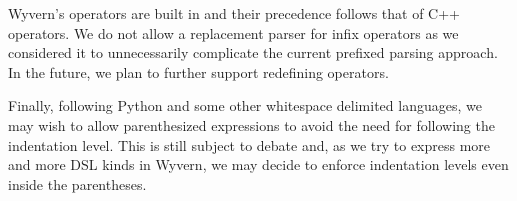 Wyvern's operators are built in and their precedence follows that of
C++ operators. We do not allow a replacement parser for infix
operators as we considered it to unnecessarily complicate the current
prefixed parsing approach. In the future, we plan to further support
redefining operators.

Finally, following Python and some other whitespace delimited
languages, we may wish to allow parenthesized expressions to avoid the need for
following the indentation level. This is still subject to debate and,
as we try to express more and more DSL kinds in Wyvern, we may decide
to enforce indentation levels even inside the parentheses.
